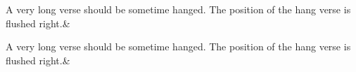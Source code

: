 \documentclass{article}
\begin{document}
\begin{pages}
\begin{Leftside}
 \renewcommand{\hangingsymbol}{\hfill[}
 \beginnumbering
 	\stanza
   A very long verse should be sometime hanged. The position of the hang verse is flushed right.\&
 \endnumbering
\end{Leftside}

\begin{Rightside}
 \renewcommand{\hangingsymbol}{\hfill[}
 \beginnumbering
 	\stanza
   A very long verse should be sometime hanged. The position of the hang verse is flushed right.\&
 \endnumbering
\end{Rightside}
	\Pages
\end{pages}
\end{document}

